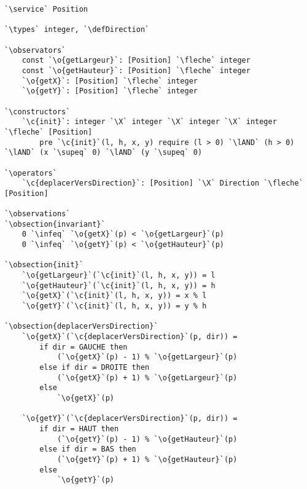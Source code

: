 \documentclass{article}
\newcommand{\fleche}{$\rightarrow{}$}
\newcommand{\X}{$\times{}$}
\newcommand{\supeq}{$\geq$~}
\newcommand{\infeq}{$\leq$~}
\newcommand{\lAND}{$\land$}
\newcommand{\specsec}[1]{\normalfont{\large{\textbf{#1:}}}}
\newcommand{\service}{\specsec {Service}}
\newcommand{\types}{\specsec {Types}}
\newcommand{\observators}{\specsec {Observators}}
\newcommand{\constructors}{\specsec {Constructors}}
\newcommand{\operators}{\specsec {Operators}}
\newcommand{\observations}{\specsec {Observations}}
\newcommand{\obsection}[1]{\textbf{[#1]}}
\newcommand{\Direction}{Direction}
\newcommand{\defDirection}{\mbox{enum \Direction}~\{~HAUT, BAS, GAUCHE, DROITE~\}}
\renewcommand{\o}[1]{\textcolor{blue}{#1}}
\renewcommand{\c}[1]{\textcolor{red}{#1}}
\begin{document}
\begin{lstlisting}[caption=Position]
`\service` Position

`\types` integer, `\defDirection`

`\observators`
	const `\o{getLargeur}`: [Position] `\fleche` integer
	const `\o{getHauteur}`: [Position] `\fleche` integer
	`\o{getX}`: [Position] `\fleche` integer
	`\o{getY}`: [Position] `\fleche` integer

`\constructors`
	`\c{init}`: integer `\X` integer `\X` integer `\X` integer `\fleche` [Position]
		pre `\c{init}`(l, h, x, y) require (l > 0) `\lAND` (h > 0) `\lAND` (x `\supeq` 0) `\lAND` (y `\supeq` 0)

`\operators`
	`\c{deplacerVersDirection}`: [Position] `\X` Direction `\fleche` [Position]

`\observations`
`\obsection{invariant}`
	0 `\infeq` `\o{getX}`(p) < `\o{getLargeur}`(p)
	0 `\infeq` `\o{getY}`(p) < `\o{getHauteur}`(p)

`\obsection{init}`
	`\o{getLargeur}`(`\c{init}`(l, h, x, y)) = l
	`\o{getHauteur}`(`\c{init}`(l, h, x, y)) = h
	`\o{getX}`(`\c{init}`(l, h, x, y)) = x % l
	`\o{getY}`(`\c{init}`(l, h, x, y)) = y % h

`\obsection{deplacerVersDirection}`
	`\o{getX}`(`\c{deplacerVersDirection}`(p, dir)) =
		if dir = GAUCHE then
			(`\o{getX}`(p) - 1) % `\o{getLargeur}`(p)
		else if dir = DROITE then
			(`\o{getX}`(p) + 1) % `\o{getLargeur}`(p)
		else
			`\o{getX}`(p)

	`\o{getY}`(`\c{deplacerVersDirection}`(p, dir)) =
		if dir = HAUT then
			(`\o{getY}`(p) - 1) % `\o{getHauteur}`(p)
		else if dir = BAS then
			(`\o{getY}`(p) + 1) % `\o{getHauteur}`(p)
		else
			`\o{getY}`(p)
\end{lstlisting}

\clearpage{}
\end{document}
